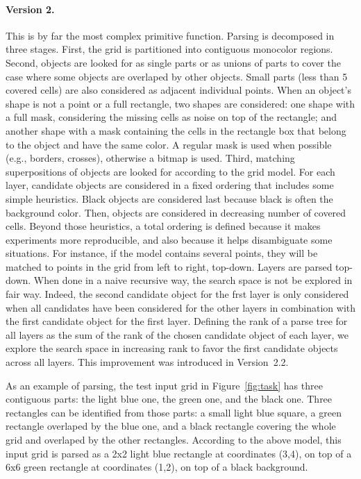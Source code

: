 \documentclass[a4paper]{llncs}
\begin{document}
\paragraph{Version 2.} This is by far the most complex primitive
function.
%
Parsing is decomposed in three stages. First, the grid is partitioned
into contiguous monocolor regions.
%
Second, objects are looked for as single parts or as unions of parts
to cover the case where some objects are overlaped by other
objects. Small parts (less than 5 covered cells) are also considered
as adjacent individual points. When an object's shape is not a point
or a full rectangle, two shapes are considered: one shape with a full
mask, considering the missing cells as noise on top of the rectangle;
and another shape with a mask containing the cells in the rectangle
box that belong to the object and have the same color. A regular mask
is used when possible (e.g., borders, crosses), otherwise a bitmap is
used.
%
Third, matching superpositions of objects are looked for according to
the grid model. For each layer, candidate objects are considered in a
fixed ordering that includes some simple heuristics. Black objects are
considered last because black is often the background color. Then,
objects are considered in decreasing number of covered cells. Beyond
those heuristics, a total ordering is defined because it makes
experiments more reproducible, and also because it helps disambiguate
some situations. For instance, if the model contains several points,
they will be matched to points in the grid from left to right,
top-down.
%
Layers are parsed top-down. When done in a naive recursive way, the
search space is not be explored in fair way. Indeed, the second
candidate object for the frst layer is only considered when all
candidates have been considered for the other layers in combination
with the first candidate object for the first layer. Defining the rank
of a parse tree for all layers as the sum of the rank of the chosen
candidate object of each layer, we explore the search space in
increasing rank to favor the first candidate objects across all
layers. This improvement was introduced in Version~2.2.

As an example of parsing, the test input grid in Figure~\ref{fig:task}
has three contiguous parts: the light blue one, the green one, and the
black one. Three rectangles can be identified from those parts: a
small light blue square, a green rectangle overlaped by the blue one,
and a black rectangle covering the whole grid and overlaped by the
other rectangles. According to the above model, this input grid is
parsed as a 2x2 light blue rectangle at coordinates (3,4), on top of a
6x6 green rectangle at coordinates (1,2), on top of a black
background.
\end{document}
